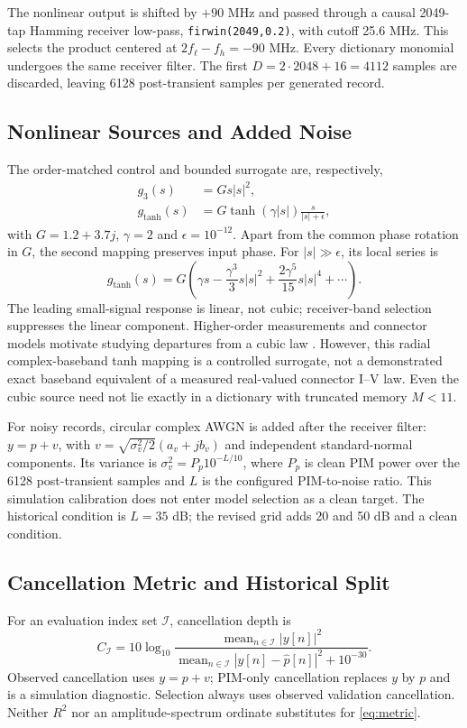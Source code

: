 \documentclass[conference]{IEEEtran}
\begin{document}
The nonlinear output is shifted by $+90$ MHz and passed through a causal 2049-tap Hamming receiver low-pass, \texttt{firwin(2049,0.2)}, with cutoff 25.6 MHz. This selects the product centered at $2f_\ell-f_h=-90$ MHz. Every dictionary monomial undergoes the same receiver filter. The first $D=2\cdot2048+16=4112$ samples are discarded, leaving 6128 post-transient samples per generated record.

\subsection{Nonlinear Sources and Added Noise}
The order-matched control and bounded surrogate are, respectively,
\begin{align}
 g_3(s)&=G s|s|^2,\label{eq:pure-cubic}\\
 g_{\tanh}(s)&=G\tanh(\gamma|s|)\frac{s}{|s|+\epsilon},\label{eq:tanh}
\end{align}
with $G=1.2+3.7j$, $\gamma=2$ and $\epsilon=10^{-12}$. Apart from the common phase rotation in $G$, the second mapping preserves input phase. For $|s|\gg\epsilon$, its local series is
\begin{equation}
 g_{\tanh}(s)=G\left(\gamma s-\frac{\gamma^3}{3}s|s|^2
 +\frac{2\gamma^5}{15}s|s|^4+\cdots\right).
 \label{eq:tanh-series}
\end{equation}
The leading small-signal response is linear, not cubic; receiver-band selection suppresses the linear component. Higher-order measurements and connector models motivate studying departures from a cubic law \cite{Christianson2008HigherOrder,Henrie2008Prediction}. However, this radial complex-baseband tanh mapping is a controlled surrogate, not a demonstrated exact baseband equivalent of a measured real-valued connector I--V law. Even the cubic source need not lie exactly in a dictionary with truncated memory $M<11$.

For noisy records, circular complex AWGN is added after the receiver filter: $y=p+v$, with $v=\sqrt{\sigma_v^2/2}(a_v+jb_v)$ and independent standard-normal components. Its variance is $\sigma_v^2=P_p10^{-L/10}$, where $P_p$ is clean PIM power over the 6128 post-transient samples and $L$ is the configured PIM-to-noise ratio. This simulation calibration does not enter model selection as a clean target. The historical condition is $L=35$ dB; the revised grid adds 20 and 50 dB and a clean condition.

\subsection{Cancellation Metric and Historical Split}
For an evaluation index set $\mathcal I$, cancellation depth is
\begin{equation}
 C_{\mathcal I}=10\log_{10}\frac{\operatorname{mean}_{n\in\mathcal I}|y[n]|^2}
 {\operatorname{mean}_{n\in\mathcal I}|y[n]-\widehat p[n]|^2+10^{-30}}.
 \label{eq:metric}
\end{equation}
Observed cancellation uses $y=p+v$; PIM-only cancellation replaces $y$ by $p$ and is a simulation diagnostic. Selection always uses observed validation cancellation. Neither $R^2$ nor an amplitude-spectrum ordinate substitutes for \eqref{eq:metric}.
\end{document}
